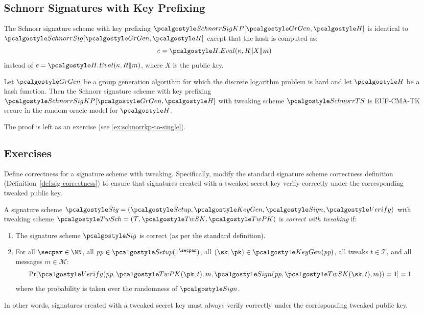 \subsection{Schnorr Signatures with Key Prefixing}

\begin{definition}\label{def:schnorr-kp}
  The Schnorr signature scheme with key prefixing $\algo{SchnorrSigKP}[\grgen, \algo{H}]$ is identical to $\algo{SchnorrSig}[\grgen, \algo{H}]$ except that the hash is computed as:
  \[
    c = \algo{H.Eval}(\kappa, R \| X \| m)
  \]
  instead of $c = \algo{H.Eval}(\kappa, R \| m)$, where $X$ is the public key.
\end{definition}

\begin{theorem}\label{thm:schnorrkp-euf-cma-tk}
  Let $\grgen$ be a group generation algorithm for which the discrete logarithm problem is hard and let $\algo{H}$ be a hash function.
  Then the Schnorr signature scheme with key prefixing $\algo{SchnorrSigKP}[\grgen, \algo{H}]$ with tweaking scheme $\algo{SchnorrTS}$ is EUF-CMA-TK secure in the random oracle model for $\algo{H}$.
\end{theorem}

The proof is left as an exercise (see \autoref{ex:schnorrkp-to-single}).

\subsection{Exercises}

\begin{exercise}
  Define correctness for a signature scheme with tweaking.
  Specifically, modify the standard signature scheme correctness definition (Definition~\ref{def:sig-correctness}) to ensure that signatures created with a tweaked secret key verify correctly under the corresponding tweaked public key.
\end{exercise}

\ifsolutions
\begin{mysolution}
  A signature scheme $\algo{Sig} = (\algo{Setup}, \algo{KeyGen}, \algo{Sign}, \algo{Verify})$ with tweaking scheme $\algo{TwSch} = (\mathcal{T}, \algo{TwSK}, \algo{TwPK})$ is \emph{correct with tweaking} if:
  \begin{enumerate}
    \item The signature scheme $\algo{Sig}$ is correct (as per the standard definition).
    \item For all $\secpar \in \NN$, all $\params \in \algo{Setup}(1^\secpar)$, all $(\sk, \pk) \in \algo{KeyGen}(\params)$, all tweaks $t \in \mathcal{T}$, and all messages $m \in \mathcal{M}$:
    \[
      \Pr[\algo{Verify}(\params, \algo{TwPK}(\pk, t), m, \algo{Sign}(\params, \algo{TwSK}(\sk, t), m)) = 1] = 1
    \]
    where the probability is taken over the randomness of $\algo{Sign}$.
  \end{enumerate}
  
  In other words, signatures created with a tweaked secret key must always verify correctly under the corresponding tweaked public key.
\end{mysolution}
\fi

